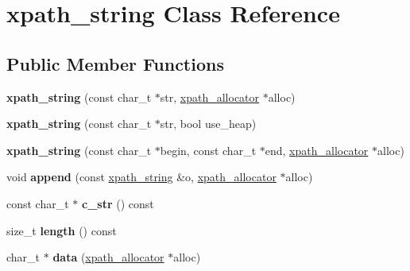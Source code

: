 \hypertarget{classxpath__string}{\section{xpath\-\_\-string Class Reference}
\label{classxpath__string}
}
\subsection*{Public Member Functions}
\begin{DoxyCompactItemize}
\item 
\hypertarget{classxpath__string_aac8b63876bb7f9ad6f709e8b2c823557}{{\bfseries xpath\-\_\-string} (const char\-\_\-t $\ast$str, \hyperlink{classxpath__allocator}{xpath\-\_\-allocator} $\ast$alloc)}\label{classxpath__string_aac8b63876bb7f9ad6f709e8b2c823557}

\item 
\hypertarget{classxpath__string_ae0661540ff7edecdf8a74f919b15f2eb}{{\bfseries xpath\-\_\-string} (const char\-\_\-t $\ast$str, bool use\-\_\-heap)}\label{classxpath__string_ae0661540ff7edecdf8a74f919b15f2eb}

\item 
\hypertarget{classxpath__string_ac46dc4ad206c24ade43acff34c241883}{{\bfseries xpath\-\_\-string} (const char\-\_\-t $\ast$begin, const char\-\_\-t $\ast$end, \hyperlink{classxpath__allocator}{xpath\-\_\-allocator} $\ast$alloc)}\label{classxpath__string_ac46dc4ad206c24ade43acff34c241883}

\item 
\hypertarget{classxpath__string_aab0d867c56d390213cf0fbe7334e1cc0}{void {\bfseries append} (const \hyperlink{classxpath__string}{xpath\-\_\-string} \&o, \hyperlink{classxpath__allocator}{xpath\-\_\-allocator} $\ast$alloc)}\label{classxpath__string_aab0d867c56d390213cf0fbe7334e1cc0}

\item 
\hypertarget{classxpath__string_a0c5d08cda063f380e065f87041d20b39}{const char\-\_\-t $\ast$ {\bfseries c\-\_\-str} () const }\label{classxpath__string_a0c5d08cda063f380e065f87041d20b39}

\item 
\hypertarget{classxpath__string_a1238d6fdad0766a21965cfeb668f5a5b}{size\-\_\-t {\bfseries length} () const }\label{classxpath__string_a1238d6fdad0766a21965cfeb668f5a5b}

\item 
\hypertarget{classxpath__string_ade42a938746bcba171b70bfb88c3c568}{char\-\_\-t $\ast$ {\bfseries data} (\hyperlink{classxpath__allocator}{xpath\-\_\-allocator} $\ast$alloc)}\label{classxpath__string_ade42a938746bcba171b70bfb88c3c568}


\end{DoxyCompactItemize}
